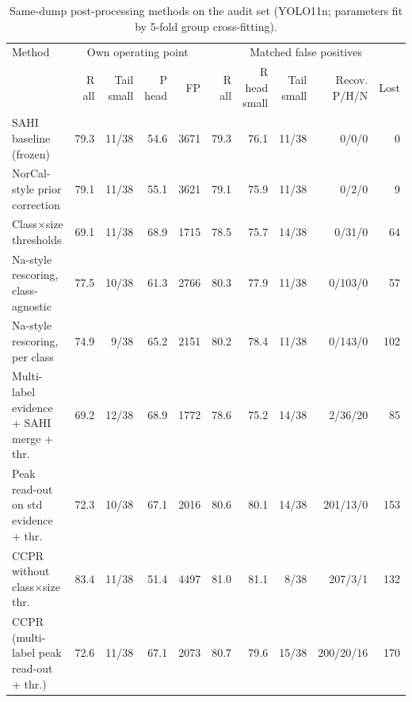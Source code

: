 \begin{table}[!htbp]
\fontsize{6pt}{7pt}\selectfont
\caption{Same-dump post-processing methods on the audit set (YOLO11n; parameters fit by 5-fold group cross-fitting).}
\label{tab:methods}
\begin{tabular*}{\textwidth}{@{\extracolsep{\fill}}p{3cm}rrrrrrrrr}
\toprule
Method & \multicolumn{4}{c}{Own operating point} & \multicolumn{5}{c}{Matched false positives} \\ \cmidrule(lr){2-5}\cmidrule(lr){6-10} & R all & \shortstack{Tail\\small} & \shortstack{P\\head} & FP & R all & \shortstack{R head\\small} & \shortstack{Tail\\small} & \shortstack{Recov.\\P/H/N} & Lost \\
\midrule
SAHI baseline (frozen) & 79.3 & 11/38 & 54.6 & 3671 & 79.3 & 76.1 & 11/38 & 0/0/0 & 0 \\
NorCal-style prior correction & 79.1 & 11/38 & 55.1 & 3621 & 79.1 & 75.9 & 11/38 & 0/2/0 & 9 \\
Class$\times$size thresholds & 69.1 & 11/38 & 68.9 & 1715 & 78.5 & 75.7 & 14/38 & 0/31/0 & 64 \\
Na-style rescoring, class-agnostic & 77.5 & 10/38 & 61.3 & 2766 & 80.3 & 77.9 & 11/38 & 0/103/0 & 57 \\
Na-style rescoring, per class & 74.9 & 9/38 & 65.2 & 2151 & 80.2 & 78.4 & 11/38 & 0/143/0 & 102 \\
Multi-label evidence + SAHI merge + thr. & 69.2 & 12/38 & 68.9 & 1772 & 78.6 & 75.2 & 14/38 & 2/36/20 & 85 \\
Peak read-out on std evidence + thr. & 72.3 & 10/38 & 67.1 & 2016 & 80.6 & 80.1 & 14/38 & 201/13/0 & 153 \\
CCPR without class$\times$size thr. & 83.4 & 11/38 & 51.4 & 4497 & 81.0 & 81.1 & 8/38 & 207/3/1 & 132 \\
CCPR (multi-label peak read-out + thr.) & 72.6 & 11/38 & 67.1 & 2073 & 80.7 & 79.6 & 15/38 & 200/20/16 & 170 \\
\bottomrule
\end{tabular*}
\end{table}
